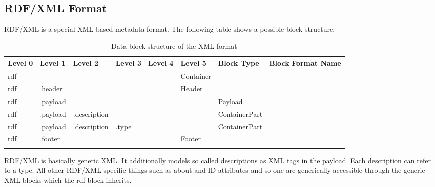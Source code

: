 \subsection{RDF/XML Format}
\label{sec:RDFXMLFormat}

RDF/XML is a special XML-based metadata format. The following table shows a possible block structure:

\begin{longtable}{|p{}|p{}|p{}|p{}|p{}|p{}|p{}|p{}|}
	\hline
	Level 0 & Level 1 & Level 2 & Level 3 & Level 4 & Level 5 & Block Type & Block Format Name\\
	\endhead
	\hline
 	rdf & & & & & Container & & \\
	\hline
 	rdf & .header & & & & Header & & \\
	\hline
 	rdf & .payload & & & & & Payload & \\
	\hline
 	rdf & .payload & .description & & & & ContainerPart & \\
	\hline
 	rdf & .payload & .description & .type & & & ContainerPart & \\
	\hline
 	rdf & .footer & & & & Footer & & \\
	\hline
	\caption{Data block structure of the XML format}
	\label{tab:DatablockstructureoftheXMLformats}
\end{longtable}


RDF/XML is basically generic XML. It additionally models so called descriptions as XML tags in the payload. Each description can refer to a type. All other RDF/XML specific things such as about and ID attributes and so one are generically accessible through the generic XML blocks which the rdf block inherits.

%
%

